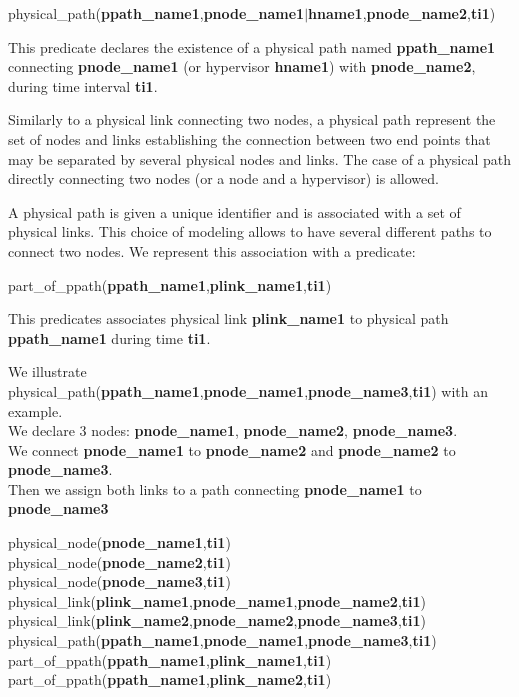 \begin{myformula}
physical\_path(\textbf{ppath\_name1},\textbf{pnode\_name1}$\vert$\textbf{hname1},\textbf{pnode\_name2},\textbf{ti1})
\end{myformula}

This predicate declares the existence of a physical path named \textbf{ppath\_name1} connecting \textbf{pnode\_name1} (or hypervisor \textbf{hname1}) with \textbf{pnode\_name2}, during time interval \textbf{ti1}. 

Similarly to a physical link connecting two nodes, a physical path represent the set of nodes and links establishing the connection between two end points that may be separated by several physical nodes and links.
The case of a physical path directly connecting two nodes (or a node and a hypervisor) is allowed.

A physical path is given a unique identifier and is associated with a set of physical links. 
This choice of modeling allows to have several different paths to connect two nodes. 
We represent this association with a predicate:

\begin{myformula}
part\_of\_ppath(\textbf{ppath\_name1},\textbf{plink\_name1},\textbf{ti1})
\end{myformula}


This predicates associates physical link \textbf{plink\_name1} to physical path \textbf{ppath\_name1} during time \textbf{ti1}.

We illustrate physical\_path(\textbf{ppath\_name1},\textbf{pnode\_name1},\textbf{pnode\_name3},\textbf{ti1}) with an example.\\
We declare 3 nodes: \textbf{pnode\_name1}, \textbf{pnode\_name2}, \textbf{pnode\_name3}.\\
We connect \textbf{pnode\_name1} to \textbf{pnode\_name2} and \textbf{pnode\_name2} to \textbf{pnode\_name3}.\\
Then we assign both links to a path connecting \textbf{pnode\_name1} to \textbf{pnode\_name3}

\begin{myformula}
physical\_node(\textbf{pnode\_name1},\textbf{ti1})\\
physical\_node(\textbf{pnode\_name2},\textbf{ti1})\\
physical\_node(\textbf{pnode\_name3},\textbf{ti1})\\
physical\_link(\textbf{plink\_name1},\textbf{pnode\_name1},\textbf{pnode\_name2},\textbf{ti1})\\
physical\_link(\textbf{plink\_name2},\textbf{pnode\_name2},\textbf{pnode\_name3},\textbf{ti1})\\
physical\_path(\textbf{ppath\_name1},\textbf{pnode\_name1},\textbf{pnode\_name3},\textbf{ti1})\\
part\_of\_ppath(\textbf{ppath\_name1},\textbf{plink\_name1},\textbf{ti1})\\
part\_of\_ppath(\textbf{ppath\_name1},\textbf{plink\_name2},\textbf{ti1})
\end{myformula}

